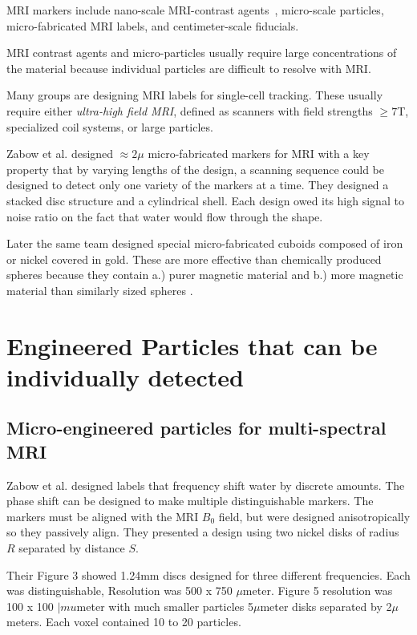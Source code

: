 \documentclass[letterpaper, 10 pt, conference]{ieeeconf}
\begin{document}
MRI markers include nano-scale MRI-contrast agents~\cite{carroll2010experimental}, micro-scale particles, micro-fabricated MRI labels, and centimeter-scale fiducials. 

MRI contrast agents and micro-particles usually require large concentrations of the material because individual particles are difficult to resolve with MRI.

Many groups are designing MRI labels for single-cell tracking.  These usually require either \emph{ultra-high field MRI}, defined as scanners with field strengths $\ge7$T, specialized coil systems, or large particles.


Zabow et al. designed $\approx2\mu$ micro-fabricated markers for MRI with a key property that by varying lengths of the design, a scanning sequence could be designed to detect only one variety of the markers at a time.  They designed a stacked disc structure and a cylindrical shell\cite{zabow2008micro}.  Each design owed its high signal to noise ratio on the fact that water would flow through the shape.

Later the same team designed special micro-fabricated cuboids composed of iron or nickel covered in gold.  These are more effective than chemically produced spheres because they contain a.) purer magnetic material and b.) more magnetic material than similarly sized spheres \cite{zabow2009design}.


\section{Engineered Particles that can be individually detected}

\subsection{Micro-engineered  particles for multi-spectral MRI}

Zabow et al. \cite{zabow2008micro} designed labels that frequency shift water by discrete amounts.  The phase shift can be designed  to make multiple distinguishable markers.  The markers must be aligned with the MRI $B_0$ field, but were designed anisotropically so they passively align. They presented a design using two nickel disks of radius $R$ separated by distance $S$. 

Their Figure 3 showed 1.24mm discs designed for three different frequencies.  Each was distinguishable, Resolution was 500 x 750 $
\mu$meter.  Figure 5 resolution was 100 x 100 $|mu$meter with much smaller particles 5$\mu$meter disks separated by 2$\mu$meters.  Each voxel contained 10 to 20 particles.
\end{document}
